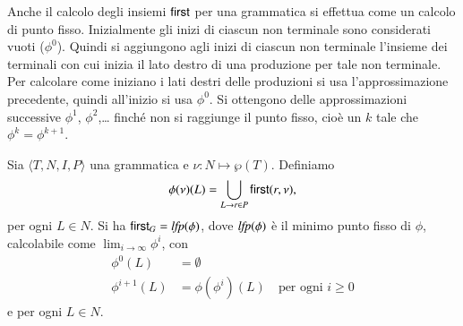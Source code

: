 Anche il calcolo degli insiemi $\mathsf{first}$ per una grammatica si effettua
come un calcolo di punto fisso. Inizialmente gli inizi di ciascun non
terminale sono considerati vuoti ($\phi^0$). Quindi si aggiungono
agli inizi di ciascun non terminale l'insieme dei terminali con cui
inizia il lato destro di una produzione per tale non terminale.
Per calcolare come iniziano i lati destri delle produzioni
si usa l'approssimazione precedente, quindi all'inizio si usa $\phi^0$.
Si ottengono \cosi delle approssimazioni successive $\phi^1$, $\phi^2$,\ldots
finch\'e non si raggiunge il punto fisso, cio\`e un $k$ tale che
$\phi^k=\phi^{k+1}$.
%
\begin{proposition}\label{prop:first}
Sia $\langle T,N,I,P\rangle$ una grammatica e $\nu:N\mapsto\wp(T)$. Definiamo
\[
  \phi(\nu)(L)=\bigcup\limits_{L\to r\in P}\mathsf{first}(r,\nu),
\]
per ogni $L\in N$.
Si ha $\mathsf{first}_G=\mathit{lfp}(\phi)$, dove $\mathit{lfp}(\phi)$ \`e il minimo punto
fisso di $\phi$, calcolabile come $\lim_{i\to\infty}\phi^i$, con
\begin{align*}
  \phi^0(L)&=\emptyset\\
  \phi^{i+1}(L)&=\phi(\phi^i)(L)\quad\text{per ogni $i\ge 0$}
\end{align*}
e per ogni $L\in N$.
\end{proposition}

